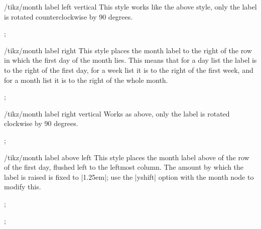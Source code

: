 \begin{stylekey}{/tikz/month label left vertical}
    This style works like the above style, only the label is rotated
    counterclockwise by 90 degrees.
\begin{codeexample}[preamble={\usetikzlibrary{calendar}}]
\tikz
  \calendar [dates=2000-01-28 to 2000-02-03,
             day list downward,month yshift=1em,
             month label left vertical];
\end{codeexample}
\end{stylekey}

\begin{stylekey}{/tikz/month label right}
    This style places the month label to the right of the row in which the
    first day of the month lies. This means that for a day list the label is to
    the right of the first day, for a week list it is to the right of the first
    week, and for a month list it is to the right of the whole month.
\begin{codeexample}[preamble={\usetikzlibrary{calendar}}]
\tikz
  \calendar [dates=2000-01-28 to 2000-02-03,
             day list downward,month yshift=1em,
             month label right];
\end{codeexample}
\end{stylekey}

\begin{stylekey}{/tikz/month label right vertical}
    Works as above, only the label is rotated clockwise by 90 degrees.
\begin{codeexample}[preamble={\usetikzlibrary{calendar}}]
\tikz
  \calendar [dates=2000-01-28 to 2000-02-03,
             day list downward,month yshift=1em,
             month label right vertical];
\end{codeexample}
\end{stylekey}

\begin{stylekey}{/tikz/month label above left}
    This style places the month label above of the row of the first day,
    flushed left to the leftmost column. The amount by which the label is
    raised is fixed to |1.25em|; use the |yshift| option with the month node to
    modify this.
\begin{codeexample}[preamble={\usetikzlibrary{calendar}}]
\tikz
  \calendar [dates=2000-01-28 to 2000-02-03,
             day list right,month xshift=1em,
             month label above left];
\end{codeexample}
\begin{codeexample}[preamble={\usetikzlibrary{calendar}}]
\tikz
  \calendar [dates=2000-01-20 to 2000-02-10,
             week list,month label above left];
\end{codeexample}
\end{stylekey}

